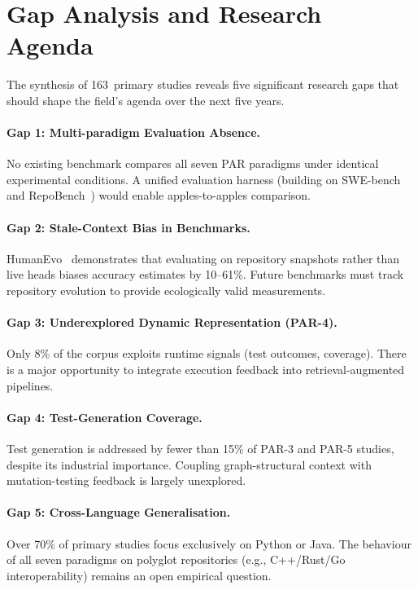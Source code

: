 
\section{Gap Analysis and Research Agenda}
\label{sec:gaps}

The synthesis of 163~primary studies reveals five significant research gaps
that should shape the field's agenda over the next five years.

\paragraph{Gap 1: Multi-paradigm Evaluation Absence.}
No existing benchmark compares all seven PAR paradigms under identical
experimental conditions.  A unified evaluation harness (building on
SWE-bench~\cite{jimenez2024swebench} and RepoBench~\cite{liu2024repobench})
would enable apples-to-apples comparison.

\paragraph{Gap 2: Stale-Context Bias in Benchmarks.}
HumanEvo~\cite{zheng2025humanevo} demonstrates that evaluating on repository
snapshots rather than live heads biases accuracy estimates by 10–61\%.
Future benchmarks must track repository evolution to provide
ecologically valid measurements.

\paragraph{Gap 3: Underexplored Dynamic Representation (PAR-4).}
Only 8\% of the corpus exploits runtime signals (test outcomes, coverage).
There is a major opportunity to integrate execution feedback into
retrieval-augmented pipelines.

\paragraph{Gap 4: Test-Generation Coverage.}
Test generation is addressed by fewer than 15\% of PAR-3 and PAR-5 studies,
despite its industrial importance.  Coupling graph-structural context with
mutation-testing feedback is largely unexplored.

\paragraph{Gap 5: Cross-Language Generalisation.}
Over 70\% of primary studies focus exclusively on Python or Java.
The behaviour of all seven paradigms on polyglot repositories
(e.g., C++/Rust/Go interoperability) remains an open empirical question.
